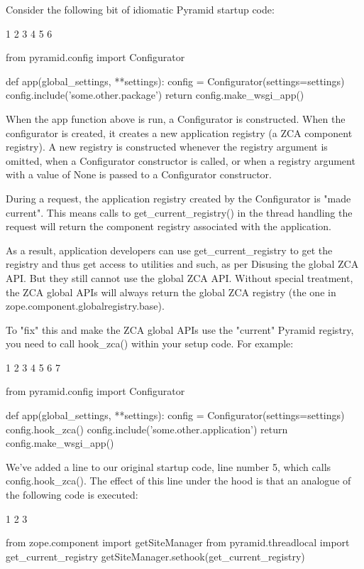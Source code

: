 \documentclass[a4paper,openany,twoside,final]{book}
\begin{document}
Consider the following bit of idiomatic Pyramid startup code:

1
2
3
4
5
6



from pyramid.config import Configurator

def app(global_settings, **settings):
    config = Configurator(settings=settings)
    config.include('some.other.package')
    return config.make_wsgi_app()

When the app function above is run, a Configurator is constructed. When the configurator is created, it creates a new application registry (a ZCA component registry). A new registry is constructed whenever the registry argument is omitted, when a Configurator constructor is called, or when a registry argument with a value of None is passed to a Configurator constructor.

During a request, the application registry created by the Configurator is "made current". This means calls to get_current_registry() in the thread handling the request will return the component registry associated with the application.

As a result, application developers can use get_current_registry to get the registry and thus get access to utilities and such, as per Disusing the global ZCA API. But they still cannot use the global ZCA API. Without special treatment, the ZCA global APIs will always return the global ZCA registry (the one in zope.component.globalregistry.base).

To "fix" this and make the ZCA global APIs use the "current" Pyramid registry, you need to call hook_zca() within your setup code. For example:

1
2
3
4
5
6
7



from pyramid.config import Configurator

def app(global_settings, **settings):
    config = Configurator(settings=settings)
    config.hook_zca()
    config.include('some.other.application')
    return config.make_wsgi_app()

We've added a line to our original startup code, line number 5, which calls config.hook_zca(). The effect of this line under the hood is that an analogue of the following code is executed:

1
2
3



from zope.component import getSiteManager
from pyramid.threadlocal import get_current_registry
getSiteManager.sethook(get_current_registry)
\end{document}
